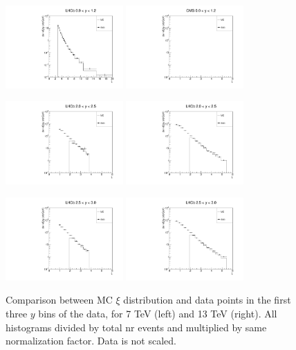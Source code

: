 \documentclass{article}
\begin{document}
\clearpage

\begin{figure}[h!]
\centering
\includegraphics[width = 0.4\textwidth]{plots/xi_CMS_y4_7.pdf}
\includegraphics[width = 0.4\textwidth]{plots/xi_CMS_13.pdf}

\includegraphics[width = 0.4\textwidth]{plots/xi_LHCb_y1_7.pdf}
\includegraphics[width = 0.4\textwidth]{plots/xi_LHCb_y1_13.pdf}

\includegraphics[width = 0.4\textwidth]{plots/xi_LHCb_y2_7.pdf}
\includegraphics[width = 0.4\textwidth]{plots/xi_LHCb_y2_13.pdf}
\caption{Comparison between MC $\xi$ distribution and data points in the first three $y$ bins of the data, for 7 TeV (left) and 13 TeV (right). All histograms divided by total nr events and multiplied by same normalization factor. Data is not scaled.}\label{f:xi_comp_2}
\end{figure}
\end{document}
